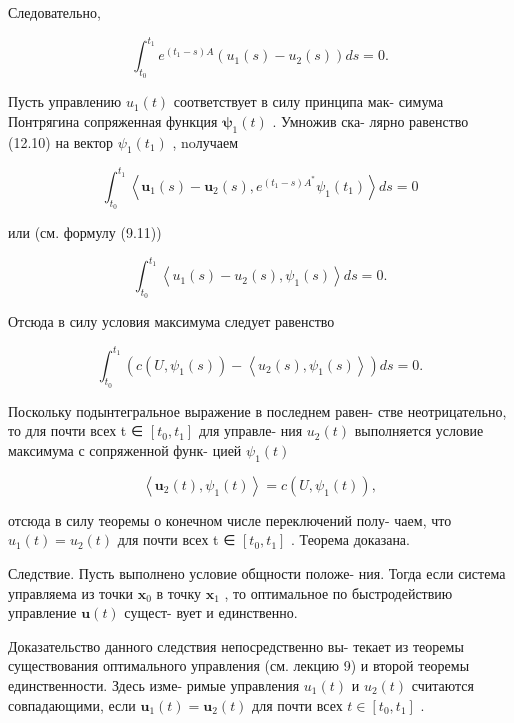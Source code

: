 \documentclass[8pt]{extarticle}
\begin{document}
Следовательно,

\[
{\int }_{{t}_{0}}^{{t}_{1}}{e}^{\left( {{t}_{1} - s}\right) A}\left( {{u}_{1}\left( s\right)  - {u}_{2}\left( s\right) }\right) {ds} = 0. \tag{12.10}
\]

Пусть управлению \({u}_{1}\left( t\right)\) соответствует в силу принципа мак- симума Понтрягина сопряженная функция \({\mathbf{\psi }}_{1}\left( t\right)\) . Умножив ска- лярно равенство (12.10) на вектор \({\psi }_{1}\left( {t}_{1}\right)\) , noлучаем

\[
{\int }_{{t}_{0}}^{{t}_{1}}\left\langle  {{\mathbf{u}}_{1}\left( s\right)  - {\mathbf{u}}_{2}\left( s\right) ,{e}^{\left( {{t}_{1} - s}\right) {A}^{ * }}{\psi }_{1}\left( {t}_{1}\right) }\right\rangle  {ds} = 0
\]

или (см. формулу (9.11))

\[
{\int }_{{t}_{0}}^{{t}_{1}}\left\langle  {{u}_{1}\left( s\right)  - {u}_{2}\left( s\right) ,{\psi }_{1}\left( s\right) }\right\rangle  {ds} = 0.
\]

Отсюда в силу условия максимума следует равенство

\[
{\int }_{{t}_{0}}^{{t}_{1}}\left( {c\left( {U,{\psi }_{1}\left( s\right) }\right)  - \left\langle  {{u}_{2}\left( s\right) ,{\psi }_{1}\left( s\right) }\right\rangle  }\right) {ds} = 0.
\]

Поскольку подынтегральное выражение в последнем равен- стве неотрицательно, то для почти всех t ∈ \(\left\lbrack  {{t}_{0},{t}_{1}}\right\rbrack\) для управле- ния \({u}_{2}\left( t\right)\) выполняется условие максимума с сопряженной функ- цией \({\psi }_{1}\left( t\right)\)

\[
\left\langle  {{\mathbf{u}}_{2}\left( t\right) ,{\psi }_{1}\left( t\right) }\right\rangle   = c\left( {U,{\psi }_{1}\left( t\right) }\right) ,
\]

отсюда в силу теоремы о конечном числе переключений полу- чаем, что \({u}_{1}\left( t\right)  = {u}_{2}\left( t\right)\) для почти всех t ∈ \(\left\lbrack  {{t}_{0},{t}_{1}}\right\rbrack\) . Теорема доказана.

Следствие. Пусть выполнено условие общности положе- ния. Тогда если система управляема из точки \({\mathbf{x}}_{0}\) в точку \({\mathbf{x}}_{1}\) , то оптимальное по быстродействию управление \(\mathbf{u}\left( t\right)\) сущест- вует и единственно.

Доказательство данного следствия непосредственно вы- текает из теоремы существования оптимального управления (см. лекцию 9) и второй теоремы единственности. Здесь изме- римые управления \({u}_{1}\left( t\right)\) и \({u}_{2}\left( t\right)\) считаются совпадающими, если \({\mathbf{u}}_{1}\left( t\right)  = {\mathbf{u}}_{2}\left( t\right)\) для почти всех \(t \in  \left\lbrack  {{t}_{0},{t}_{1}}\right\rbrack\) .
\end{document}
